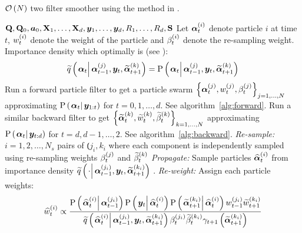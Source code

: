\begin{algorithm}
\caption{$\mathcal{O}\left( N\right)$ two filter smoother using the method in \cite{fearnhead10}.}\label{alg:ONsmoother}
\begin{algorithmic}[1]\raggedright
\INPUT
\Statex $\mathbf{Q},\mathbf{Q}_0,\bm{a}_0,\mathbf{X}_1,\dots,\mathbf{X}_d,\bm{y}_1,\dots,\bm{y}_d,R_1,\dots,R_d,\mathbf{S}$
%
\Statex Let $\bm{\alpha}_{t}^{\left( i\right)}$ denote particle $i$ at time $t$, $w_{t}^{\left( i\right)}$ denote the weight of the particle and $\beta_{t}^{\left( i\right)}$ denote the re-sampling weight.
%
\Statex Importance density which optimally is (see \citet[page 453]{fearnhead10}): 
\Statex \begin{equation}
	\IDAproxC{\vec{\alpha}_t}{\partic{\vec{\alpha}}{t-1}{j},\vec{y}_t, \particB{\vec{\alpha}}{t+1}{k}} = 
%
	\propC{\vec{\alpha}_t}{\partic{\vec{\alpha}}{t-1}{j},\vec{y}_t, \particB{\vec{\alpha}}{t+1}{k}}
\end{equation}
%
\State Run a forward particle filter to get a particle swarm %
	$\left\{ \bm{\alpha}_{t}^{\left( j\right)}, w_{t}^{\left( j\right)}, \beta_{t}^{\left( j\right)}\right\}_{j=1,\dots,N}$ %
	approximating $\propC{\vec{\alpha}_t}{\vec{y}_{1:t}}$ for $t = 0, 1, \dots, d$. See algorithm~\ref{alg:forward}.
\EndProcedure
%
\State Run a similar backward filter to get %
	$\left\{ \widetilde{\bm{\alpha}}_{t}^{\left( k\right)}, \widetilde{w}_{t}^{\left( k\right)}, \widetilde{\beta}_{t}^{\left( k\right)}\right\}_{k=1,\dots,N}$  %
	approximating $\propC{\vec{\alpha}_t}{\vec{y}_{t:d}}$ for $t = d, d-1, \dots , 2$. See algorithm~\ref{alg:backward}.
\EndProcedure
% 
\StateXX \emph{Re-sample:}
\State $i=1,2,\dots,N_s$ pairs of $\Lparen{j_i, k_i}$ where each component is independently sampled using re-sampling weights $\beta_{t}^{\left( j\right)}$ and $\widetilde{\beta}_{t}^{\left( k\right)}$
%
\StateXX \emph{Propagate:} 
\State Sample particles $\widehat{\bm{\alpha}}_{t}^{\left( i\right)}$ from importance density %
	$\IDAproxC{\cdot}{\partic{\vec{\alpha}}{t-1}{j_i},\vec{y}_t, \particB{\vec{\alpha}}{t + 1}{k_i}}$
.%
\StateXX \emph{Re-weight:}
\State Assign each particle weights:
\StateXX \begin{equation}\label{eqn:combineWeight}
 \particS{w}{t}{i} \propto \frac{
 	\propC{\particS{\vec{\alpha}}{t}{i}}{\partic{\vec{\alpha}}{t - 1}{j_i}}
 	\propC{\vec{y}_t}{\particS{\vec{\alpha}}{t}{i}}
 	\propC{\particB{\vec{\alpha}}{t + 1}{k_i}}{\particS{\vec{\alpha}}{t}{i}}
 	\partic{w}{t - 1}{j_i}\particB{w}{t + 1}{k_i}
 	}{ %
 	\IDAproxC{\particS{\vec{\alpha}}{t}{i}}{\partic{\vec{\alpha}}{t-1}{j_i},\vec{y}_t, \particB{\vec{\alpha}}{t+1}{k_i}}
 	\partic{\beta}{t}{j_i}\particB{\beta}{t}{k_i}\gamma_{t +1}\Lparen{\particB{\vec{\alpha}}{t+1}{k_i}}
 	} %
\end{equation}
\EndFor
\EndProcedure
\end{algorithmic}
\end{algorithm}



